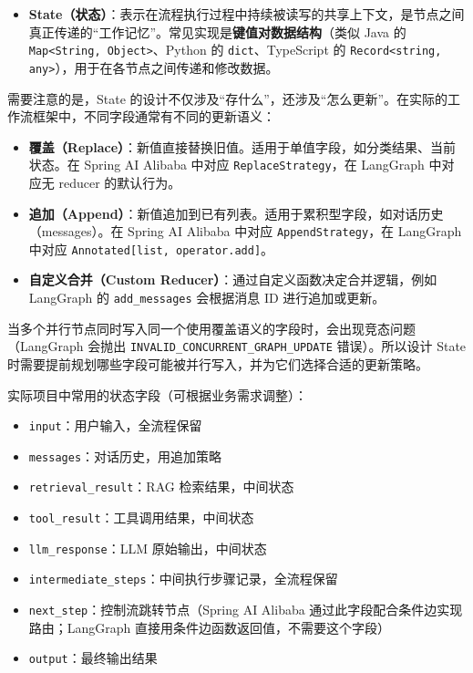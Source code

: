 \documentclass[9pt,a4paper,twocolumn]{ctexart}
\begin{document}
\begin{itemize}[itemsep=1pt, topsep=2pt]
  \item \textbf{State（状态）}：表示在流程执行过程中持续被读写的共享上下文，是节点之间真正传递的“工作记忆”。常见实现是\textbf{键值对数据结构}（类似 Java 的 \texttt{Map<String, Object>}、Python 的 \texttt{dict}、TypeScript 的 \texttt{Record<string, any>}），用于在各节点之间传递和修改数据。
\end{itemize}


需要注意的是，State 的设计不仅涉及“存什么”，还涉及“怎么更新”。在实际的工作流框架中，不同字段通常有不同的更新语义：


\begin{itemize}[itemsep=1pt, topsep=2pt]
  \item \textbf{覆盖（Replace）}：新值直接替换旧值。适用于单值字段，如分类结果、当前状态。在 Spring AI Alibaba 中对应 \texttt{ReplaceStrategy}，在 LangGraph 中对应无 reducer 的默认行为。
  \item \textbf{追加（Append）}：新值追加到已有列表。适用于累积型字段，如对话历史（messages）。在 Spring AI Alibaba 中对应 \texttt{AppendStrategy}，在 LangGraph 中对应 \texttt{Annotated[list, operator.add]}。
  \item \textbf{自定义合并（Custom Reducer）}：通过自定义函数决定合并逻辑，例如 LangGraph 的 \texttt{add\_messages} 会根据消息 ID 进行追加或更新。
\end{itemize}


当多个并行节点同时写入同一个使用覆盖语义的字段时，会出现竞态问题（LangGraph 会抛出 \texttt{INVALID\_CONCURRENT\_GRAPH\_UPDATE} 错误）。所以设计 State 时需要提前规划哪些字段可能被并行写入，并为它们选择合适的更新策略。



实际项目中常用的状态字段（可根据业务需求调整）：


\begin{itemize}[itemsep=1pt, topsep=2pt]
  \item \texttt{input}：用户输入，全流程保留
  \item \texttt{messages}：对话历史，用追加策略
  \item \texttt{retrieval\_result}：RAG 检索结果，中间状态
  \item \texttt{tool\_result}：工具调用结果，中间状态
  \item \texttt{llm\_response}：LLM 原始输出，中间状态
  \item \texttt{intermediate\_steps}：中间执行步骤记录，全流程保留
  \item \texttt{next\_step}：控制流跳转节点（Spring AI Alibaba 通过此字段配合条件边实现路由；LangGraph 直接用条件边函数返回值，不需要这个字段）
  \item \texttt{output}：最终输出结果
\end{itemize}
\end{document}
